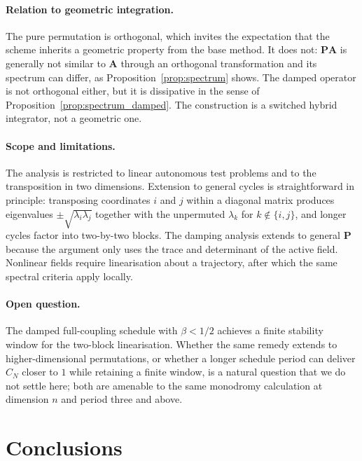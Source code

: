 \documentclass[12pt, a4paper]{article}
\theoremstyle{plain}
\theoremstyle{definition}
\theoremstyle{remark}
\newcommand{\bP}{\mathbf{P}}
\newcommand{\bA}{\mathbf{A}}
\begin{document}
\paragraph{Relation to geometric integration.} The pure permutation is
orthogonal, which invites the expectation that the scheme inherits a geometric
property from the base method. It does not: $\bP\bA$ is generally not similar
to $\bA$ through an orthogonal transformation and its spectrum can differ, as
Proposition~\ref{prop:spectrum} shows. The damped operator is not orthogonal
either, but it is dissipative in the sense of Proposition~\ref{prop:spectrum_damped}.
The construction is a switched hybrid integrator, not a geometric one.

\paragraph{Scope and limitations.} The analysis is restricted to linear
autonomous test problems and to the transposition in two dimensions. Extension
to general cycles is straightforward in principle: transposing coordinates $i$
and $j$ within a diagonal matrix produces eigenvalues
$\pm\sqrt{\lambda_i\lambda_j}$ together with the unpermuted $\lambda_k$ for
$k\notin\{i,j\}$, and longer cycles factor into two-by-two blocks. The
damping analysis extends to general $\bP$ because the argument only uses the
trace and determinant of the active field. Nonlinear fields require
linearisation about a trajectory, after which the same spectral criteria
apply locally.

\paragraph{Open question.} The damped full-coupling schedule with
$\beta < 1/2$ achieves a finite stability window for the two-block
linearisation. Whether the same remedy extends to higher-dimensional
permutations, or whether a longer schedule period can deliver $C_N$ closer to
$1$ while retaining a finite window, is a natural question that we do not
settle here; both are amenable to the same monodromy calculation at
dimension $n$ and period three and above.

\section{Conclusions}
\label{sec:conclusions}
\end{document}
